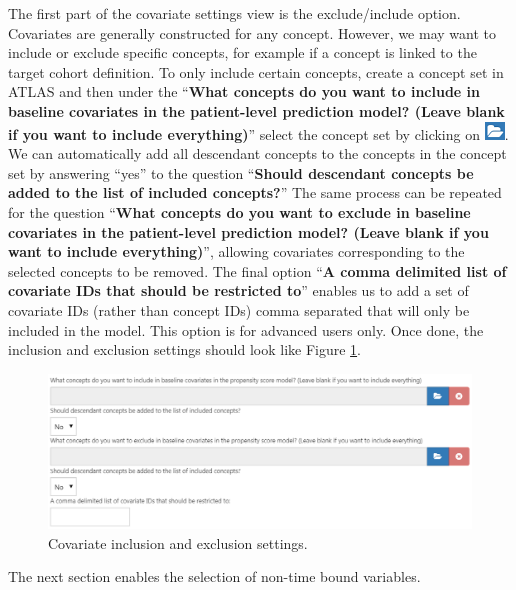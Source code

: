 \documentclass[11pt]{book}
\theoremstyle{definition}
\theoremstyle{definition}
\theoremstyle{definition}
\theoremstyle{remark}
\begin{document}
The first part of the covariate settings view is the exclude/include
option. Covariates are generally constructed for any concept. However,
we may want to include or exclude specific concepts, for example if a
concept is linked to the target cohort definition. To only include
certain concepts, create a concept set in ATLAS and then under the
``\textbf{What concepts do you want to include in baseline covariates in
the patient-level prediction model? (Leave blank if you want to include
everything)}'' select the concept set by clicking on
\includegraphics{images/PopulationLevelEstimation/open.png}. We can
automatically add all descendant concepts to the concepts in the concept
set by answering ``yes'' to the question ``\textbf{Should descendant
concepts be added to the list of included concepts?}'' The same process
can be repeated for the question ``\textbf{What concepts do you want to
exclude in baseline covariates in the patient-level prediction model?
(Leave blank if you want to include everything)}'', allowing covariates
corresponding to the selected concepts to be removed. The final option
``\textbf{A comma delimited list of covariate IDs that should be
restricted to}'' enables us to add a set of covariate IDs (rather than
concept IDs) comma separated that will only be included in the model.
This option is for advanced users only. Once done, the inclusion and
exclusion settings should look like Figure \ref{fig:covariateSettings1}.

\begin{figure}

{\centering \includegraphics[width=1\linewidth]{images/PatientLevelPrediction/covariateSettings1} 

}

\caption{Covariate inclusion and exclusion settings.}\label{fig:covariateSettings1}
\end{figure}

The next section enables the selection of non-time bound variables.
\end{document}
